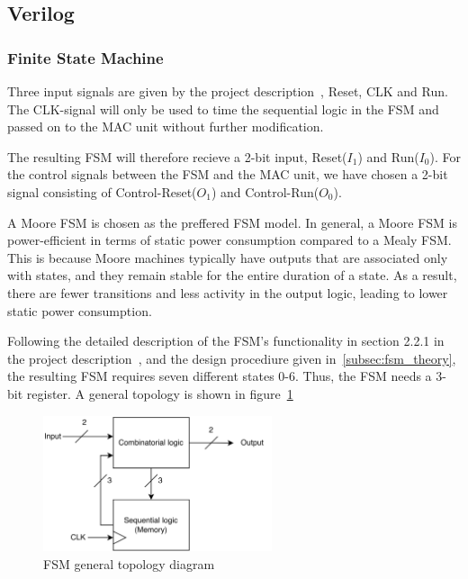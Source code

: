 \subsection{Verilog}


\subsubsection{Finite State Machine}
\label{subsec:fsm_}

Three input signals are given by the project description~\cite{project_description}, Reset, CLK and Run. The CLK-signal will only be used to time the sequential logic in the FSM and passed on to the MAC unit without further modification.

The resulting FSM will therefore recieve a 2-bit input, Reset($I_1$) and Run($I_0$). For the control signals between the FSM and the MAC unit, we have chosen a 2-bit signal consisting of Control-Reset($O_1$) and Control-Run($O_0$). 

A Moore FSM is chosen as the preffered FSM model. In general, a Moore FSM is power-efficient in terms of static power consumption compared to a Mealy FSM. This is because Moore machines typically have outputs that are associated only with states, and they remain stable for the entire duration of a state. As a result, there are fewer transitions and less activity in the output logic, leading to lower static power consumption.

Following the detailed description of the FSM's functionality in section 2.2.1 in the project description~\cite{project_description}, and the design procediure given in~\ref{subsec:fsm_theory}, the resulting FSM requires seven different states 0-6. Thus, the FSM needs a 3-bit register. A general topology is shown in figure~\ref{fig:fsm_overordnet}

\begin{figure}[H]
    \centering
    \includegraphics[width=0.6\textwidth]{Figures/FSM_overordnet.drawio.png}
    \caption{FSM general topology diagram}
    \label{fig:fsm_overordnet}
\end{figure}


